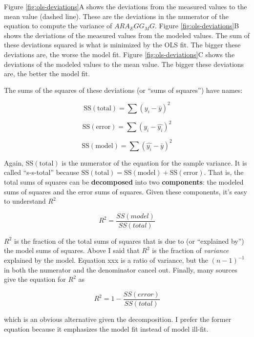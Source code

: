 \documentclass[]{book}
\begin{document}
Figure \ref{fig:ols-deviations}A shows the deviations from the measured
values to the mean value (dashed line). These are the deviations in the
numerator of the equation to compute the variance of \(ARA_EGG_MG\).
Figure \ref{fig:ols-deviations}B shows the deviations of the measured
values from the modeled values. The sum of these deviations squared is
what is minimized by the OLS fit. The bigger these deviations are, the
worse the model fit. Figure \ref{fig:ols-deviations}C shows the
deviations of the modeled values to the mean value. The bigger these
deviations are, the better the model fit.

The sums of the squares of these deviations (or ``sums of squares'')
have names:

\begin{equation}
\mathrm{SS(total)} = \sum{(y_i - \bar{y})^2}
\end{equation}

\begin{equation}
\mathrm{SS(error)} = \sum{(y_i - \hat{y_i})^2}
\end{equation}

\begin{equation}
\mathrm{SS(model)} = \sum{(\hat{y_i} - \bar{y})^2}
\end{equation}

Again, \(\mathrm{SS(total)}\) is the numerator of the equation for the
sample variance. It is called ``s-s-total'' because
\(\mathrm{SS(total)} = \mathrm{SS(model)} + \mathrm{SS(error)}\). That
is, the total sums of squares can be \textbf{decomposed} into two
\textbf{components}: the modeled sums of squares and the error sums of
squares. Given these components, it's easy to understand \(R^2\)

\begin{equation}
R^2 = \frac{SS(model)}{SS(total)}
\end{equation}

\(R^2\) is the fraction of the total sums of squares that is due to (or
``explained by'') the model sums of squares. Above I said that \(R^2\)
is the fraction of \emph{variance} explained by the model. Equation xxx
is a ratio of variance, but the \((n-1)^{-1}\) in both the numerator and
the denominator cancel out. Finally, many sources give the equation for
\(R^2\) as

\begin{equation}
R^2 = 1- \frac{SS(error)}{SS(total)}
\end{equation}

which is an obvious alternative given the decomposition. I prefer the
former equation because it emphasizes the model fit instead of model
ill-fit.
\end{document}
